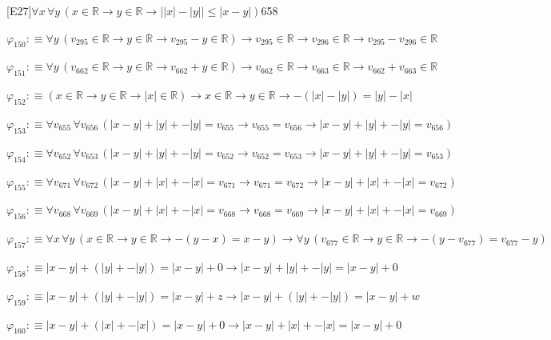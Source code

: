 \begin{fullproof}{[E27]}{$\forall x\,\forall y\,(x \in \mathbb{R} \to y \in \mathbb{R} \to \lvert \lvert x \rvert - \lvert y \rvert \rvert \leq \lvert x - y \rvert)$}{658}
\begin{abbrevlist}
\item $\varphi_{150} :\equiv \forall y\,(v_{295} \in \mathbb{R} \to y \in \mathbb{R} \to v_{295} - y \in \mathbb{R}) \to v_{295} \in \mathbb{R} \to v_{296} \in \mathbb{R} \to v_{295} - v_{296} \in \mathbb{R}$
\item $\varphi_{151} :\equiv \forall y\,(v_{662} \in \mathbb{R} \to y \in \mathbb{R} \to v_{662} + y \in \mathbb{R}) \to v_{662} \in \mathbb{R} \to v_{663} \in \mathbb{R} \to v_{662} + v_{663} \in \mathbb{R}$
\item $\varphi_{152} :\equiv (x \in \mathbb{R} \to y \in \mathbb{R} \to \lvert x \rvert \in \mathbb{R}) \to x \in \mathbb{R} \to y \in \mathbb{R} \to -(\lvert x \rvert - \lvert y \rvert) = \lvert y \rvert - \lvert x \rvert$
\item $\varphi_{153} :\equiv \forall v_{655}\,\forall v_{656}\,(\lvert x - y \rvert + \lvert y \rvert + -\lvert y \rvert = v_{655} \to v_{655} = v_{656} \to \lvert x - y \rvert + \lvert y \rvert + -\lvert y \rvert = v_{656})$
\item $\varphi_{154} :\equiv \forall v_{652}\,\forall v_{653}\,(\lvert x - y \rvert + \lvert y \rvert + -\lvert y \rvert = v_{652} \to v_{652} = v_{653} \to \lvert x - y \rvert + \lvert y \rvert + -\lvert y \rvert = v_{653})$
\item $\varphi_{155} :\equiv \forall v_{671}\,\forall v_{672}\,(\lvert x - y \rvert + \lvert x \rvert + -\lvert x \rvert = v_{671} \to v_{671} = v_{672} \to \lvert x - y \rvert + \lvert x \rvert + -\lvert x \rvert = v_{672})$
\item $\varphi_{156} :\equiv \forall v_{668}\,\forall v_{669}\,(\lvert x - y \rvert + \lvert x \rvert + -\lvert x \rvert = v_{668} \to v_{668} = v_{669} \to \lvert x - y \rvert + \lvert x \rvert + -\lvert x \rvert = v_{669})$
\item $\varphi_{157} :\equiv \forall x\,\forall y\,(x \in \mathbb{R} \to y \in \mathbb{R} \to -(y - x) = x - y) \to \forall y\,(v_{677} \in \mathbb{R} \to y \in \mathbb{R} \to -(y - v_{677}) = v_{677} - y)$
\item $\varphi_{158} :\equiv \lvert x - y \rvert + (\lvert y \rvert + -\lvert y \rvert) = \lvert x - y \rvert + 0 \to \lvert x - y \rvert + \lvert y \rvert + -\lvert y \rvert = \lvert x - y \rvert + 0$
\item $\varphi_{159} :\equiv \lvert x - y \rvert + (\lvert y \rvert + -\lvert y \rvert) = \lvert x - y \rvert + z \to \lvert x - y \rvert + (\lvert y \rvert + -\lvert y \rvert) = \lvert x - y \rvert + w$
\item $\varphi_{160} :\equiv \lvert x - y \rvert + (\lvert x \rvert + -\lvert x \rvert) = \lvert x - y \rvert + 0 \to \lvert x - y \rvert + \lvert x \rvert + -\lvert x \rvert = \lvert x - y \rvert + 0$

\end{abbrevlist}
\end{fullproof}
